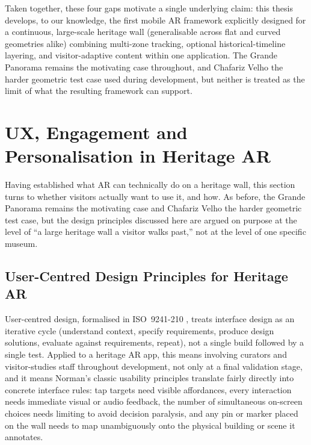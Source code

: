 Taken together, these four gaps motivate a single underlying claim: this
thesis develops, to our knowledge, the first mobile AR framework
explicitly designed for a continuous, large-scale heritage wall (generalisable across flat and curved geometries alike) combining
multi-zone tracking, optional historical-timeline layering, and
visitor-adaptive content within one application. The Grande Panorama
remains the motivating case throughout, and Chafariz Velho the harder
geometric test case used during development, but neither is treated as
the limit of what the resulting framework can support.



























\section{UX, Engagement and Personalisation in Heritage AR}
\label{sec:rw-ux}

Having established what AR can technically do on a heritage wall, this section
turns to whether visitors actually want to use it, and how. As before, the Grande
Panorama remains the motivating case and Chafariz Velho the harder geometric test
case, but the design principles discussed here are argued on purpose at the
level of ``a large heritage wall a visitor walks past,'' not at the level of one
specific museum.

\subsection{User-Centred Design Principles for Heritage AR}
\label{subsec:rw-ucd}

User-centred design, formalised in ISO~9241-210 \cite{iso9241210}, treats interface design as an
iterative cycle (understand context, specify requirements, produce design solutions, evaluate against requirements, repeat), not a single build
followed by a single test. Applied to a heritage AR app, this means involving
curators and visitor-studies staff throughout development, not only at a final
validation stage, and it means Norman's classic usability principles
\cite{norman1988} translate fairly directly into concrete interface rules: tap
targets need visible affordances, every interaction needs immediate visual or audio
feedback, the number of simultaneous on-screen choices needs limiting to avoid
decision paralysis, and any pin or marker placed on the wall needs to map
unambiguously onto the physical building or scene it annotates.

